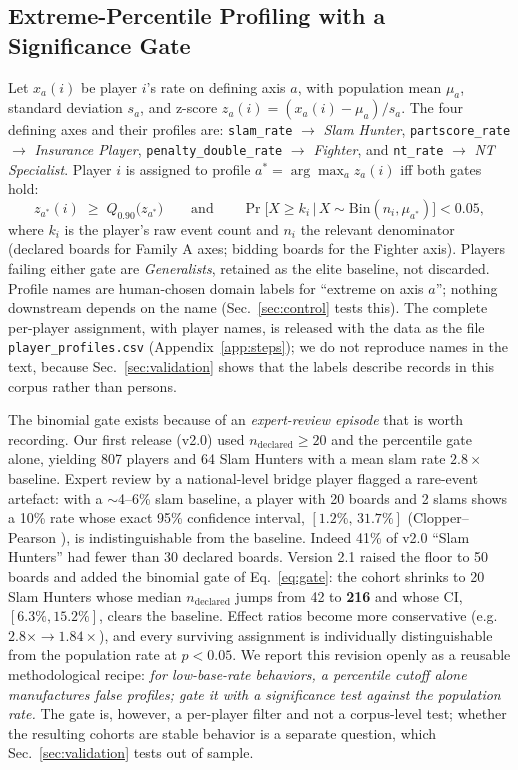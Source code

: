 \documentclass[11pt,a4paper]{article}
\begin{document}
\subsection{Extreme-Percentile Profiling with a Significance Gate}\label{sec:profiles}

Let $x_{a}(i)$ be player $i$'s rate on defining axis $a$, with
population mean $\mu_a$, standard deviation $s_a$, and z-score
$z_a(i) = (x_a(i)-\mu_a)/s_a$. The four defining axes and their
profiles are: \texttt{slam\_rate} $\to$ \emph{Slam Hunter},
\texttt{partscore\_rate} $\to$ \emph{Insurance Player},
\texttt{penalty\_double\_rate} $\to$ \emph{Fighter}, and
\texttt{nt\_rate} $\to$ \emph{NT Specialist}. Player $i$ is assigned to
profile $a^{*} = \arg\max_a z_a(i)$ iff both gates hold:
\begin{equation}
z_{a^{*}}(i) \;\ge\; Q_{0.90}\bigl(z_{a^{*}}\bigr)
\qquad\text{and}\qquad
\Pr\bigl[X \ge k_i \,\big|\, X\sim\mathrm{Bin}(n_i, \mu_{a^{*}})\bigr] < 0.05,
\label{eq:gate}
\end{equation}
where $k_i$ is the player's raw event count and $n_i$ the relevant
denominator (declared boards for Family A axes; bidding boards for the
Fighter axis). Players failing either gate are \emph{Generalists}, retained as the elite baseline, not discarded. Profile names are
human-chosen domain labels for ``extreme on axis $a$''; nothing
downstream depends on the name (Sec.~\ref{sec:control} tests this).
The complete per-player assignment, with player names, is released
with the data as the file \texttt{player\_profiles.csv}
(Appendix~\ref{app:steps}); we do not reproduce names in the text,
because Sec.~\ref{sec:validation} shows that the labels describe
records in this corpus rather than persons.

The binomial gate exists because of an \emph{expert-review episode}
that is worth recording.
Our first release (v2.0) used $n_{\mathrm{declared}}\ge20$ and the
percentile gate alone, yielding 807 players and 64 Slam Hunters with a
mean slam rate $2.8\times$ baseline. Expert review by a national-level
bridge player flagged a rare-event artefact: with a
$\sim$4--6\% slam baseline, a player with 20 boards and 2 slams shows a
10\% rate whose exact 95\% confidence interval, $[1.2\%,\,31.7\%]$
(Clopper--Pearson \cite{clopper1934use}), is indistinguishable from
the baseline. Indeed 41\% of v2.0 ``Slam Hunters'' had fewer than 30
declared boards. Version 2.1 raised the floor to 50 boards and added the
binomial gate of Eq.~\eqref{eq:gate}: the cohort shrinks to 20 Slam
Hunters whose median $n_{\mathrm{declared}}$ jumps from 42 to
\textbf{216} and whose CI, $[6.3\%, 15.2\%]$, clears the baseline.
Effect ratios become more conservative (e.g.\ $2.8\times\to1.84\times$),
and every surviving assignment is individually distinguishable from the
population rate at $p<0.05$. We report this revision openly as a
reusable methodological recipe: \emph{for low-base-rate behaviors, a
percentile cutoff alone manufactures false profiles; gate it with a
significance test against the population rate.} The gate is, however,
a per-player filter and not a corpus-level test; whether the resulting
cohorts are stable behavior is a separate question, which
Sec.~\ref{sec:validation} tests out of sample.
\end{document}
